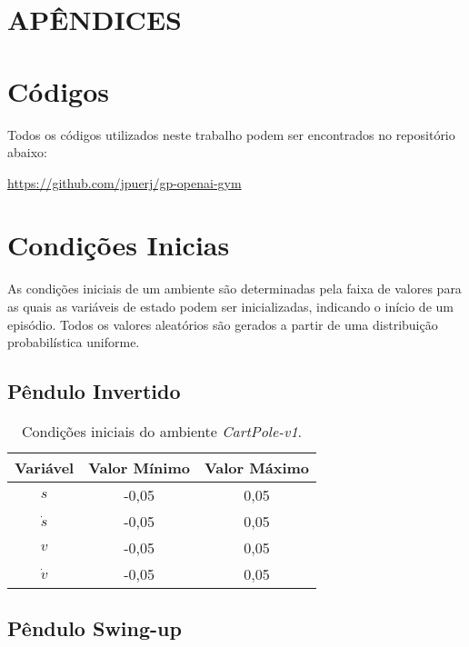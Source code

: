 \appendix
\section*{APÊNDICES}

\section{Códigos}\label{apendice:codigos}

Todos os códigos utilizados neste trabalho podem ser encontrados no repositório abaixo:

\url{https://github.com/jpuerj/gp-openai-gym}

\section{Condições Inicias}\label{apendice:cond-iniciais}

As condições iniciais de um ambiente são determinadas pela faixa de valores para as quais as variáveis de estado podem ser inicializadas, indicando o início de um episódio. Todos os valores aleatórios são gerados a partir de uma distribuição probabilística uniforme.

\subsection{Pêndulo Invertido}

\begin{table}[H]
	\centering
	\caption{Condições iniciais do ambiente \textit{CartPole-v1}.}
	\label{tab:ap-cartpoleci}
	\begin{tabular}{SSS} \toprule
		{Variável} & {Valor Mínimo} & {Valor Máximo} \\ \midrule
		{$s$} & {-0,05} & {0,05} \\
		{$\dot{s}$} & {-0,05} & {0,05} \\
		{$v$} & {-0,05} & {0,05} \\
		{$\dot{v}$} & {-0,05} & {0,05} \\
		\bottomrule
	\end{tabular}
\end{table}

\subsection{Pêndulo Swing-up}

